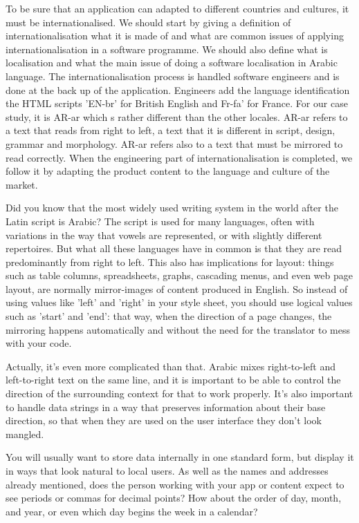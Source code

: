 \documentclass[
	a4paper, %
	10pt, %
	unnumberedsections, %
	twoside, %
]{LTJournalArticle}
\begin{document}
To be sure that an application can adapted to different countries and cultures, it must be internationalised. We should start by giving a definition of internationalisation what it is made of and what are common issues of applying internationalisation in a software programme. We should also define what is localisation and what the main issue of doing a software localisation in Arabic language. The internationalisation process is handled software engineers and is done at the back up of the application. Engineers add the language identification the HTML scripts 'EN-br' for British English and Fr-fa' for France. For our case study, it is AR-ar which s rather different than the other locales. AR-ar refers to a text that reads from right to left, a text that it is different in script, design, grammar and morphology. AR-ar refers also to a text that must be mirrored to read correctly. When the engineering part of internationalisation is completed, we follow it by adapting the product content to the language and culture of the market.

Did you know that the most widely used writing system in the world after the Latin script is Arabic? The script is used for many languages, often with variations in the way that vowels are represented, or with slightly different repertoires. But what all these languages have in common is that they are read predominantly from right to left. This also has implications for layout: things such as table columns, spreadsheets, graphs, cascading menus, and even web page layout, are normally mirror-images of content produced in English. So instead of using values like 'left' and 'right' in your style sheet, you should use logical values such as 'start' and 'end': that way, when the direction of a page changes, the mirroring happens automatically and without the need for the translator to mess with your code.

Actually, it's even more complicated than that. Arabic mixes right-to-left and left-to-right text on the same line, and it is important to be able to control the direction of the surrounding context for that to work properly. It's also important to handle data strings in a way that preserves information about their base direction, so that when they are used on the user interface they don't look mangled.

You will usually want to store data internally in one standard form, but display it in ways that look natural to local users. As well as the names and addresses already mentioned, does the person working with your app or content expect to see periods or commas for decimal points? How about the order of day, month, and year, or even which day begins the week in a calendar?
\end{document}
